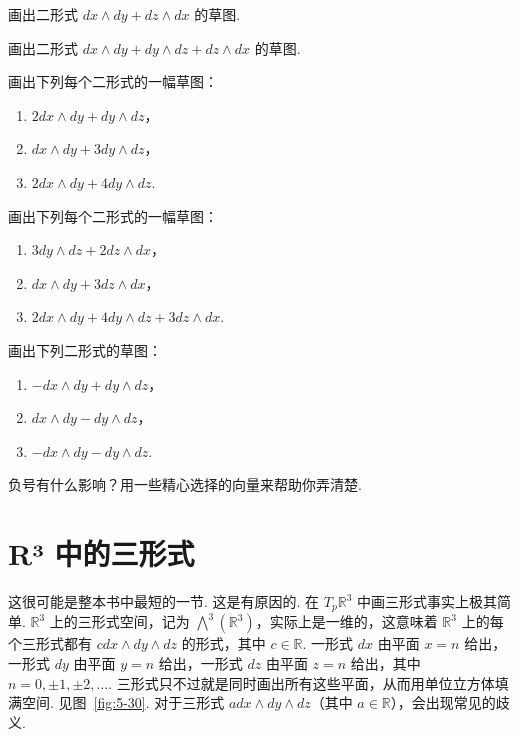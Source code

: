 \begin{question}\label{q:5-15}
画出二形式 $dx\wedge dy+dz\wedge dx$ 的草图.
\end{question}

\begin{question}\label{q:5-16}
画出二形式 $dx\wedge dy+dy\wedge dz+dz\wedge dx$ 的草图.
\end{question}

\begin{question}\label{q:5-17}
画出下列每个二形式的一幅草图：
\begin{enumerate}
  \item[(a)] $2dx\wedge dy+dy\wedge dz$，
  \item[(b)] $dx\wedge dy+3dy\wedge dz$，
  \item[(c)] $2dx\wedge dy+4dy\wedge dz$.
\end{enumerate}
\end{question}

\begin{question}\label{q:5-18}
画出下列每个二形式的一幅草图：
\begin{enumerate}
  \item[(a)] $3dy\wedge dz+2dz\wedge dx$，
  \item[(b)] $dx\wedge dy+3dz\wedge dx$，
  \item[(c)] $2dx\wedge dy+4dy\wedge dz+3dz\wedge dx$.
\end{enumerate}
\end{question}

\begin{question}\label{q:5-19}
画出下列二形式的草图：
\begin{enumerate}
  \item[(a)] $-dx\wedge dy+dy\wedge dz$，
  \item[(b)] $dx\wedge dy-dy\wedge dz$，
  \item[(c)] $-dx\wedge dy-dy\wedge dz$.
\end{enumerate}
负号有什么影响？用一些精心选择的向量来帮助你弄清楚.
\end{question}

\section{R³ 中的三形式}

这很可能是整本书中最短的一节. 这是有原因的. 在 $T_p\mathbb{R}^3$ 中画三形式事实上极其简单. $\mathbb{R}^3$ 上的三形式空间，记为 $\bigwedge^3(\mathbb{R}^3)$，实际上是一维的，这意味着 $\mathbb{R}^3$ 上的每个三形式都有 $cdx\wedge dy\wedge dz$ 的形式，其中 $c\in\mathbb{R}$. 一形式 $dx$ 由平面 $x=n$ 给出，一形式 $dy$ 由平面 $y=n$ 给出，一形式 $dz$ 由平面 $z=n$ 给出，其中 $n=0,\pm1,\pm2,\ldots$. 三形式只不过就是同时画出所有这些平面，从而用单位立方体填满空间. 见图~\ref{fig:5-30}. 对于三形式 $adx\wedge dy\wedge dz$（其中 $a\in\mathbb{R}$），会出现常见的歧义.

